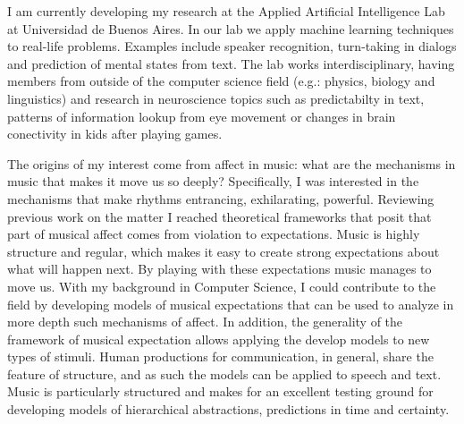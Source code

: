 
I am currently developing my research at the
Applied Artificial Intelligence Lab at Universidad de Buenos Aires. In our lab
we apply machine learning techniques to real-life problems. Examples include
speaker recognition, turn-taking in dialogs and prediction of mental states
from text. The lab works interdisciplinary, having members from outside of the
computer science field (e.g.: physics, biology and linguistics) and research in
neuroscience topics such as predictabilty in text, patterns of information
lookup from eye movement or changes in brain conectivity in kids after playing
games.

The origins of my interest come from affect in music: what are the mechanisms
in music that makes it move us so deeply? Specifically, I was interested in the
mechanisms that make rhythms entrancing, exhilarating, powerful. Reviewing
previous work on the matter I reached theoretical frameworks that posit that
part of musical affect comes from violation to expectations. Music is highly
structure and regular, which makes it easy to create strong expectations about
what will happen next. By playing with these expectations music manages to move
us. With my background in Computer Science, I could contribute to the field by
developing models of musical expectations that can be used to analyze in more
depth such mechanisms of affect. In addition, the generality of the framework
of musical expectation allows applying the develop models to new types of
stimuli. Human productions for communication, in general, share the feature of
structure, and as such the models can be applied to speech and text. Music is
particularly structured and makes for an excellent testing ground for
developing models of hierarchical abstractions, predictions in time and
certainty.

